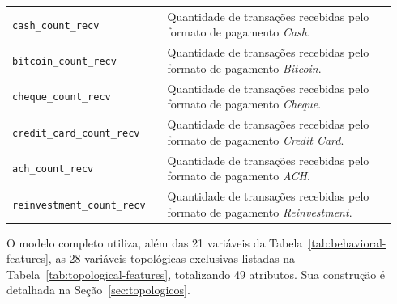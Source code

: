 \documentclass[titlepage,a4paper,oneside,onecolumn,12pt]{report}
\begin{document}
\begin{table}[htbp]
\begin{tabular}{p{0.38\linewidth}p{0.56\linewidth}}
        \texttt{cash\_count\_recv} & Quantidade de transações recebidas pelo formato de pagamento \textit{Cash}. \\
        \texttt{bitcoin\_count\_recv} & Quantidade de transações recebidas pelo formato de pagamento \textit{Bitcoin}. \\
        \texttt{cheque\_count\_recv} & Quantidade de transações recebidas pelo formato de pagamento \textit{Cheque}. \\
        \texttt{credit\_card\_count\_recv} & Quantidade de transações recebidas pelo formato de pagamento \textit{Credit Card}. \\
        \texttt{ach\_count\_recv} & Quantidade de transações recebidas pelo formato de pagamento \textit{ACH}. \\
        \texttt{reinvestment\_count\_recv} & Quantidade de transações recebidas pelo formato de pagamento \textit{Reinvestment}. \\
        \hline
    \end{tabular}
\end{table}

O modelo completo utiliza, além das 21 variáveis da Tabela~\ref{tab:behavioral-features}, as 28 variáveis topológicas exclusivas listadas na Tabela~\ref{tab:topological-features}, totalizando 49 atributos. Sua construção é detalhada na Seção~\ref{sec:topologicos}.
\end{document}
